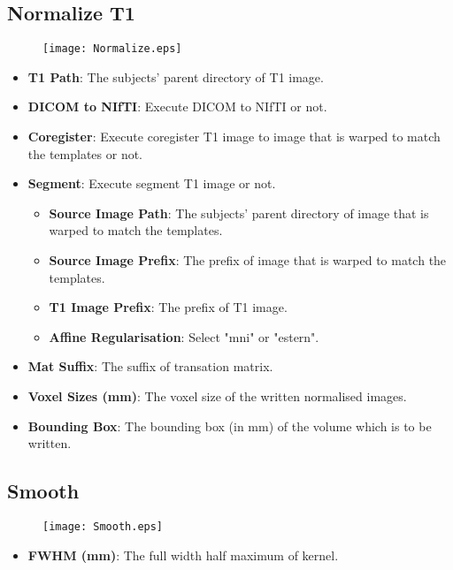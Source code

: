 \documentclass[11pt]{article}
\begin{document}
		\subsection{Normalize T1}
			\begin{figure}
				\begin{center}
					\texttt{[image: Normalize.eps]}
				\end{center}
			\end{figure}
			\begin{itemize}
				\item \textbf{T1 Path}: The subjects' parent directory of T1 image.
				\item \textbf{DICOM to NIfTI}: Execute DICOM to NIfTI or not.
				\item \textbf{Coregister}: Execute coregister T1 image to image that is warped to match the templates or not.
				\item \textbf{Segment}: Execute segment T1 image or not.
					\begin{itemize}
						\item \textbf{Source Image Path}: The subjects' parent directory of image that is warped to match the templates.
						\item \textbf{Source Image Prefix}: The prefix of image that is warped to match the templates.
						\item \textbf{T1 Image Prefix}: The prefix of T1 image.
						\item \textbf{Affine Regularisation}: Select "mni" or "estern".
					\end{itemize}
				\item \textbf{Mat Suffix}: The suffix of transation matrix.
			\end{itemize}
			\begin{itemize}
				\item \textbf{Voxel Sizes (mm)}: The voxel size of the written normalised images.
				\item \textbf{Bounding Box}: The bounding box (in mm) of the volume which is to be written. 
			\end{itemize}
		\subsection{Smooth}
			\begin{figure}
				\begin{center}
					\texttt{[image: Smooth.eps]}
				\end{center}
			\end{figure}
			\begin{itemize}
				\item \textbf{FWHM (mm)}: The full width half maximum of kernel.
			\end{itemize}
\end{document}
